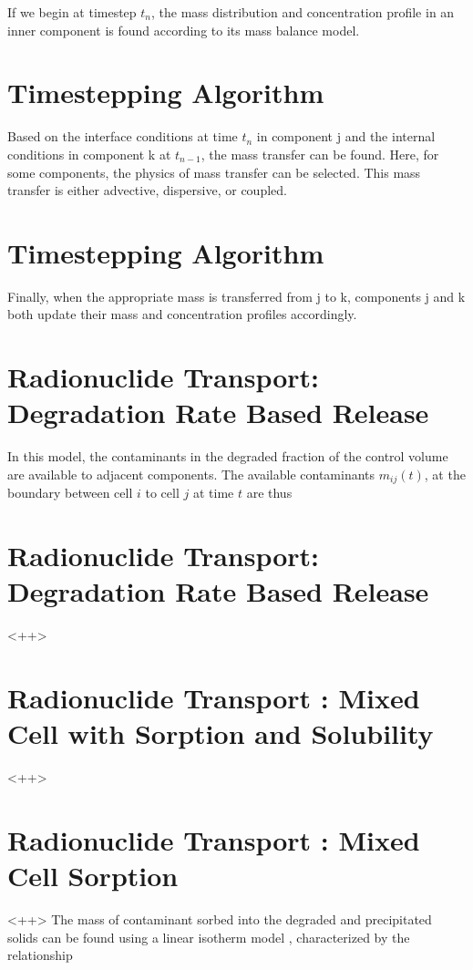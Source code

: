 \documentclass[letterpaper]{article}
\begin{document}
{If we begin at timestep $t_n$, the mass distribution and concentration 
profile in an inner component is found according to its mass balance model.

\section{Timestepping Algorithm}

Based on the interface conditions at time $t_n$ in component j and the 
internal conditions in component k at $t_{n-1}$, the mass transfer can be 
found. Here, for some components, the physics of mass transfer can be selected. 
This mass transfer is either advective, dispersive, or coupled. 

\section{Timestepping Algorithm}

Finally, when the appropriate mass is transferred from j to k, components j and 
k both update their mass and concentration profiles accordingly.


  \section{Radionuclide Transport: Degradation Rate Based Release}
In this model, the contaminants in the degraded fraction of the control volume 
are available to adjacent components. The available contaminants
$m_{ij}(t)$, at the boundary between cell $i$ to cell $j$ at time $t$ are thus

  \section{Radionuclide Transport: Degradation Rate Based Release}
<++>

  \section{Radionuclide Transport : Mixed Cell with Sorption and Solubility}
<++>

  \section{Radionuclide Transport : Mixed Cell Sorption}
<++>
The mass of contaminant sorbed into the degraded and precipitated solids can be
found using a linear isotherm model \cite{schwartz_fundamentals_2004},
characterized by the relationship 

}
\end{document}
